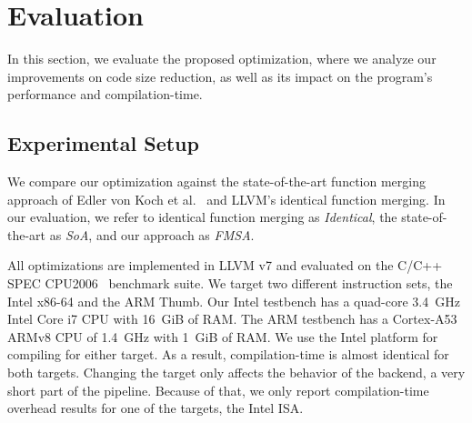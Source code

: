 \section{Evaluation}


In this section, we evaluate the proposed optimization, where we analyze our
improvements on code size reduction, as well as its impact on the program's
performance and compilation-time.



\subsection{Experimental Setup}
We compare our optimization against the state-of-the-art function merging approach of Edler von Koch et al.~\cite{edler14} and LLVM's identical
function merging. In our evaluation, we refer to identical function merging as \textit{Identical}, the state-of-the-art as \textit{SoA}, and our
approach as \textit{FMSA}.

All optimizations are implemented in LLVM v7 and evaluated on the C/C++ SPEC CPU2006~\cite{spec} benchmark suite. We target two different
instruction sets, the Intel x86-64 and the ARM Thumb. Our Intel testbench has a quad-core 3.4~GHz Intel Core i7 CPU with 16~GiB of RAM.
The ARM testbench has a Cortex-A53 ARMv8 CPU of 1.4~GHz with 1~GiB of RAM.
We use the Intel platform for compiling for either target. As a result, compilation-time is almost
identical for both targets. Changing the target only affects the behavior of the backend, a very
short part of the pipeline. Because of that, we only report compilation-time overhead results for
one of the targets, the Intel ISA.

